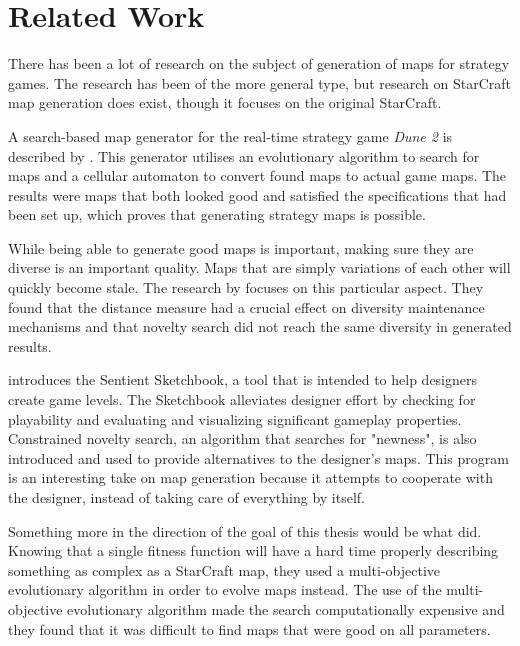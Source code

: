\chapter{Related Work}
\label{relatedwork}

There has been a lot of research on the subject of generation of maps for strategy games. The research has been of the more general type, but research on StarCraft map generation does exist, though it focuses on the original StarCraft.

A search-based map generator for the real-time strategy game \textit{Dune 2} is described by \citeauthor{Mahlmann2012Spicing}\cite{Mahlmann2012Spicing}. This generator utilises an evolutionary algorithm to search for maps and a cellular automaton to convert found maps to actual game maps. The results were maps that both looked good and satisfied the specifications that had been set up, which proves that generating strategy maps is possible.

While being able to generate good maps is important, making sure they are diverse is an important quality. Maps that are simply variations of each other will quickly become stale. The research by \citeauthor{Preuss2014Searching}\cite{Preuss2014Searching} focuses on this particular aspect. They found that the distance measure had a crucial effect on diversity maintenance mechanisms and that novelty search did not reach the same diversity in generated results.

\citeauthor{Liapis2013sentient}\cite{Liapis2013sentient} introduces the Sentient Sketchbook, a tool that is intended to help designers create game levels. The Sketchbook alleviates designer effort by checking for playability and evaluating and visualizing significant gameplay properties. Constrained novelty search, an algorithm that searches for "newness",  is also introduced and used to provide alternatives to the designer's maps. This program is an interesting take on map generation because it attempts to cooperate with the designer, instead of taking care of everything by itself.

Something more in the direction of the goal of this thesis would be what \citeauthor{Togelius2010Multiobjective}\cite{Togelius2010Multiobjective} did. Knowing that a single fitness function will have a hard time properly describing something as complex as a StarCraft map, they used a multi-objective evolutionary algorithm in order to evolve maps instead. The use of the multi-objective evolutionary algorithm made the search computationally expensive and they found that it was difficult to find maps that were good on all parameters.

